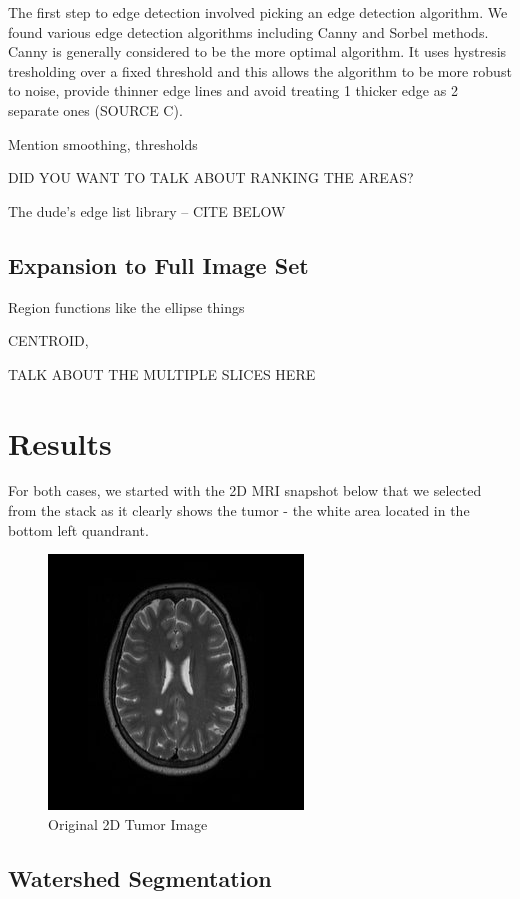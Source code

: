 \documentclass[12pt]{article}
\theoremstyle{plain}%
\theoremstyle{definition}
\theoremstyle{remark}
\begin{document}
The first step to edge detection involved picking an edge detection algorithm.  We found various edge detection algorithms including Canny and Sorbel methods.  Canny is generally considered to be the more optimal algorithm.  It uses hystresis tresholding over a fixed threshold and this allows the algorithm to be more robust to noise, provide thinner edge lines and avoid treating 1 thicker edge as 2 separate ones (SOURCE C).  

Mention smoothing, thresholds

DID YOU WANT TO TALK ABOUT RANKING THE AREAS?

The dude’s edge list library – CITE BELOW

\subsection{Expansion to Full Image Set}

Region functions like the ellipse things

CENTROID,

TALK ABOUT THE MULTIPLE SLICES HERE

\section{Results}

For both cases, we started with the 2D MRI snapshot below that we selected from the stack as it clearly shows the tumor - the white area located in the bottom left quandrant.

\begin{figure}[!h]
	\centering
		\includegraphics{original.jpg}
	\caption{Original 2D Tumor Image}
\end{figure}

\subsection{Watershed Segmentation}
\end{document}
